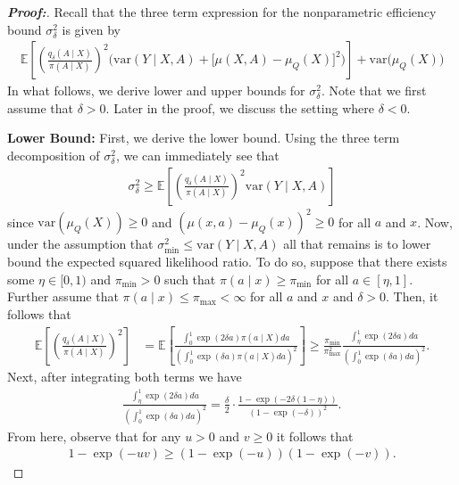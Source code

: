 \documentclass[11pt,twoside]{article}
\newcommand{\var}{\text{var}}
\theoremstyle{definition}
\theoremstyle{remark}
\begin{document}
\begin{proof}[\textbf{Proof:}] 

Recall that the three term expression for the nonparametric efficiency bound $\sigma^2_\delta$ is given by
\begin{align*}
     \mathbb{E}\left[\left(\frac{q_\delta(A \mid X)}{\pi(A \mid X)} \right)^2 \Big( \var\left( Y \mid X, A \right) +  \big[ \mu(X, A) - \mu_Q(X) \big]^2 \Big) \right] + \var\big( \mu_Q(X) \big)
\end{align*}
In what follows, we derive lower and upper bounds for $\sigma^2_\delta$. Note that we first assume that $\delta > 0$. Later in the proof, we discuss the setting where $\delta < 0$.

\noindent \textbf{Lower Bound:} First, we derive the lower bound. Using the three term decomposition of $\sigma^2_\delta$, we can immediately see that
 \begin{align*}
     \sigma^2_\delta \geq \mathbb{E}\left[\left(\frac{q_\delta(A \mid X)}{\pi(A \mid X)}\right)^2 \var\left( Y \mid X, A \right)   \right]
 \end{align*}
 since $\var( \mu_Q(X)) \geq 0$ and $(\mu(x, a) - \mu_Q(x))^2 \geq 0$ for all $a$ and $x$. Now, under the assumption that $\sigma^2_{\min} \leq \var\left( Y \mid X, A \right)$ all that remains is to lower bound the expected squared likelihood ratio. To do so, suppose that there exists some $\eta \in[0, 1)$ and $\pi_{\min} > 0$ such that $\pi(a \mid x) \geq \pi_{\min}$ for all $a \in [\eta, 1]$. Further assume that $\pi(a \mid x) \leq \pi_{\max} < \infty$ for all $a$ and $x$ and $\delta > 0$. Then, it follows that
\begin{align*}
    \mathbb{E}\left[\left(\frac{q_\delta(A \mid X)}{\pi(A \mid X)}\right)^2 \right] &= \mathbb{E}\left[\frac{\int^1_0 \exp(2 \delta a) \pi(a \mid X) da}{\left(\int^1_0 \exp(\delta a) \pi(a \mid X) da \right)^2} \right] \geq \frac{\pi_{\min}}{\pi^2_{\max}} \frac{\int^1_\eta \exp(2 \delta a)da}{\left(\int^1_0 \exp(\delta a) da \right)^2}. 
\end{align*}
Next, after integrating both terms we have
\begin{align*}
   \frac{\int^1_\eta \exp(2 \delta a)da}{\left(\int^1_0 \exp(\delta a) da \right)^2} = \frac{\delta}{2} \cdot \frac{1 - \exp(- 2 \delta(1 - \eta))}{(1 - \exp(- \delta))^2}.
\end{align*}
From here, observe that for any $u > 0$ and $v \geq 0$ it follows that
\begin{align*}
    1 - \exp(-uv) \geq (1 - \exp(-u))(1 - \exp(-v)).

\end{align*}
\end{proof}
\end{document}
